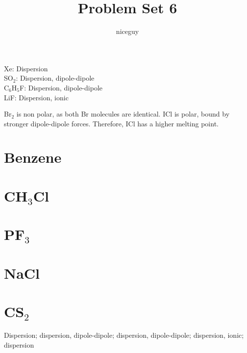 \documentclass[answers]{exam}
\title{Problem Set 6}
\author{niceguy}
\begin{document}
\maketitle

\begin{questions}


\begin{solution}
	Xe: Dispersion \\
	SO$_2$: Dispersion, dipole-dipole \\
	C$_6$H$_5$F: Dispersion, dipole-dipole \\
	LiF: Dispersion, ionic
\end{solution}


\begin{solution}
	Br$_2$ is non polar, as both Br molecules are identical. ICl is polar, bound by stronger dipole-dipole forces. Therefore, ICl has a higher melting point.
\end{solution}


\begin{parts}
	\part{Benzene}
	\part{CH$_3$Cl}
	\part{PF$_3$}
	\part{NaCl}
	\part{CS$_2$}
\end{parts}

\begin{solution}
	Dispersion; dispersion, dipole-dipole; dispersion, dipole-dipole; dispersion, ionic; dispersion
\end{solution}


\end{questions}
\end{document}
